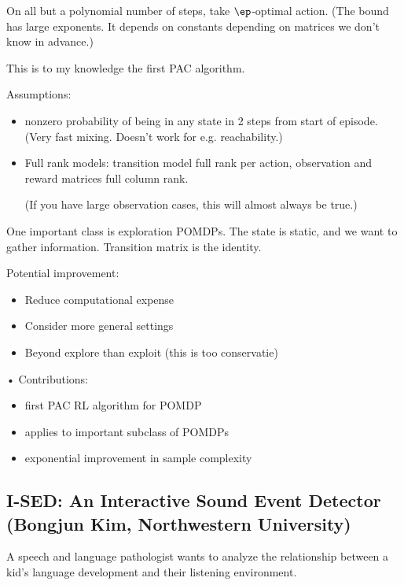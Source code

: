 On all but a polynomial number of steps, take $\ep$-optimal action. (The bound has large exponents. It depends on constants depending on matrices we don't know in advance.)

This is to my knowledge the first PAC algorithm. 

Assumptions:
\begin{itemize}
\item
nonzero probability of being in any state in 2 steps from start of episode. (Very fast mixing. Doesn't work for e.g. reachability.)
\item
Full rank models: transition model full rank per action, observation and reward matrices full column rank.

(If you have large observation cases, this will almost always be true.)
\end{itemize}

One important class is exploration POMDPs. The state is static, and we want to gather information. Transition matrix is the identity.

Potential improvement:
\begin{itemize}
\item
Reduce computational expense
\item
Consider more general settings
\item
Beyond explore than exploit (this is too conservatie)
\end{itemize}•
Contributions:
\begin{itemize}
\item
first PAC RL algorithm for POMDP
\item
applies to important subclass of POMDPs
\item
exponential improvement in sample complexity
\end{itemize}


\subsection{I-SED: An Interactive Sound Event Detector (Bongjun Kim, Northwestern University)}


A speech and language pathologist wants to analyze the relationship between a kid's language development and their listening environment.

